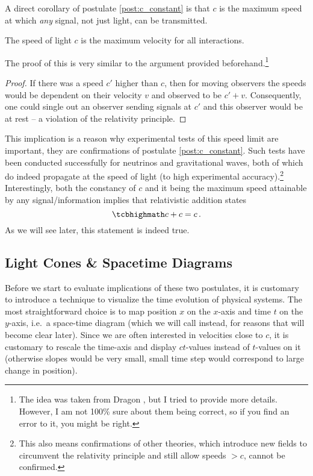 A direct corollary of postulate \ref{post:c_constant} is that $c$ is the maximum speed at which \emph{any} signal, not just light, can be transmitted.
\begin{prop}%
	The speed of light $c$ is the maximum velocity for all interactions.
\end{prop}
The proof of this is very similar to the argument provided beforehand.\footnote{The idea was taken from Dragon \cite{dragon_geometry_srt}, but I tried to provide more details. However, I am not 100\% sure about them being correct, so if you find an error to it, you might be right.}
\begin{proof}
	If there was a speed $c'$ higher than $c$, then for moving observers the speeds would be dependent on their velocity $v$ and observed to be $c' + v$. Consequently, one could single out an observer sending signals at $c'$ and this observer would be at rest -- a violation of the relativity principle.
\end{proof}

This implication is a reason why experimental tests of this speed limit are important, they are confirmations of postulate \ref{post:c_constant}. Such tests have been conducted successfully for neutrinos and gravitational waves, both of which do indeed propagate at the speed of light (to high experimental accuracy).\footnote{This also means confirmations of other theories, which introduce new fields to circumvent the relativity principle and still allow speeds $> c$, cannot be confirmed.} Interestingly, both the constancy of $c$ and it being the maximum speed attainable by any signal/information implies that relativistic addition states
\begin{equation}
	\eqbox{
	c + c = c
	} \, .
\end{equation}
As we will see later, this statement is indeed true.



		\subsection{Light Cones \& Spacetime Diagrams}
Before we start to evaluate implications of these two postulates, it is customary to introduce a technique to visualize the time evolution of physical systems. The most straightforward choice is to map position $x$ on the $x$-axis and time $t$ on the $y$-axis, i.e.~a space-time diagram (which we will call  instead, for reasons that will become clear later). Since we are often interested in velocities close to $c$, it is customary to rescale the time-axis and display $ct$-values instead of $t$-values on it (otherwise slopes would be very small, small time step would correspond to large change in position).

